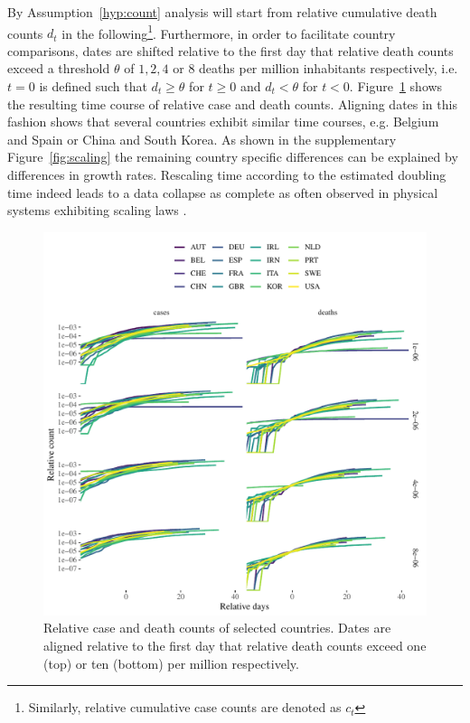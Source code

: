 \documentclass[fullpage,a4paper]{article}
\newcommand{\fig}[1]{Figure~\ref{fig:#1}}
\newcommand{\hyp}[1]{Assumption~\ref{hyp:#1}}
\begin{document}
By \hyp{count} analysis will start from relative cumulative death
counts $d_t$ in the following\footnote{Similarly, relative cumulative
  case counts are denoted as $c_t$}. Furthermore, in order to
facilitate country comparisons, dates are shifted relative to the
first day that relative death counts exceed a threshold $\theta$ of
$1, 2, 4$ or $8$ deaths per million inhabitants respectively, i.e. $t
= 0$ is defined such that $d_t \geq \theta$ for $t \geq 0$ and $d_t <
\theta$ for $t < 0$. \fig{aligned_data} shows the resulting time
course of relative case and death counts. Aligning dates in this
fashion shows that several countries exhibit similar time courses,
e.g. Belgium and Spain or China and South Korea. As shown in the
supplementary \fig{scaling} the remaining country specific differences
can be explained by differences in growth rates.  Rescaling time
according to the estimated doubling time indeed leads to a data
collapse as complete as often observed in physical systems exhibiting
scaling laws \cite{stanley99}.
\begin{figure}
  \includegraphics[width=1\textwidth]{../figs/ecdc_align_all.pdf}
  \caption{\label{fig:aligned_data} Relative case and death counts of
    selected countries. Dates are aligned relative to the first day
    that relative death counts exceed one (top) or ten (bottom) per
    million respectively.}
\end{figure}
\end{document}
